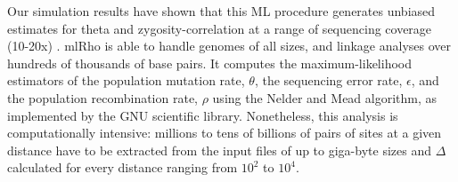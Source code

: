\documentclass{sig-alternate}
\begin{document}





Our simulation results have shown that this ML procedure generates unbiased estimates for theta and
zygosity-correlation at a range of sequencing coverage (10-20x) \cite{Lynch01112008}. mlRho is able to handle genomes of all sizes, and linkage analyses over hundreds of thousands of
base pairs. It 
computes the maximum-likelihood estimators of the population mutation 
rate, $\theta$, the sequencing error rate, $\epsilon$, and the population 
recombination rate, $\rho$ using
the Nelder and Mead algorithm, as implemented by the GNU scientific library. Nonetheless, this analysis is
computationally intensive: millions to tens of billions of pairs of sites at a given distance have
to be extracted from the input files of up to 
giga-byte sizes and $\Delta$ calculated for every distance ranging from 
$10^2$ to $10^4$.
\end{document}
